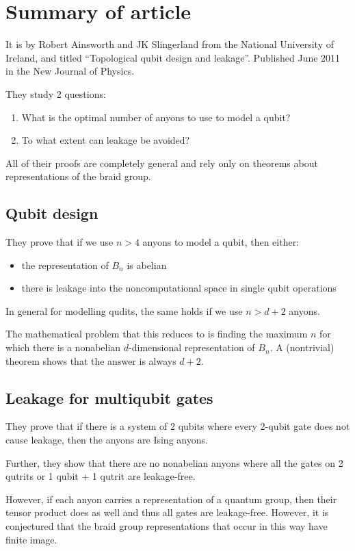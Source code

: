 \documentclass[]{article}
\begin{document}
\section{Summary of article}

It is by Robert Ainsworth and JK Slingerland from the National University of
Ireland, and titled ``Topological qubit design and leakage''. Published June
2011 in the New Journal of Physics.

They study 2 questions:

\begin{enumerate}
\item What is the optimal number of anyons to use to model a qubit?
\item To what extent can leakage be avoided?
\end{enumerate}

All of their proofs are completely general and rely only on theorems about
representations of the braid group.


\subsection{Qubit design}

They prove that if we use $n > 4$ anyons to model a qubit, then either:

\begin{itemize}
\item the representation of $B_n$ is abelian
\item there is leakage into the noncomputational space in single qubit operations
\end{itemize}

In general for modelling qudits, the same holds if we use $n > d+2$ anyons.

The mathematical problem that this reduces to is finding the maximum $n$ for
which there is a nonabelian $d$-dimensional representation of $B_n$. A
(nontrivial) theorem shows that the answer is always $d+2$.

\subsection{Leakage for multiqubit gates}

They prove that if there is a system of 2 qubits where every 2-qubit gate does
not cause leakage, then the anyons are Ising anyons.

Further, they show that there are no nonabelian anyons where all the gates on 2
qutrits or 1 qubit + 1 qutrit are leakage-free.

However, if each anyon carries a representation of a quantum group, then their
tensor product does as well and thus all gates are leakage-free. However, it is
conjectured that the braid group representations that occur in this way have
finite image.
\end{document}
